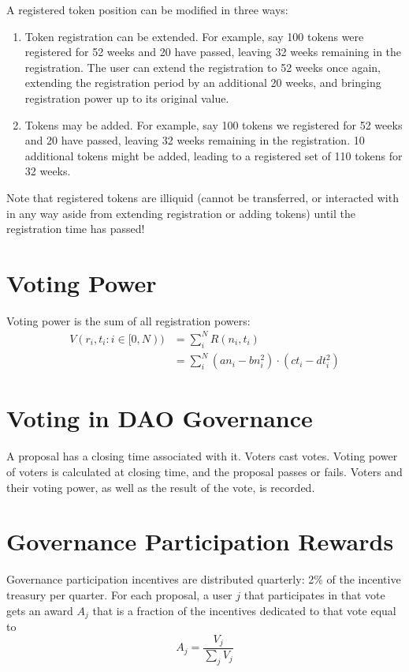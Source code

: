 \documentclass{article}
\begin{document}
A registered token position can be modified in three ways:
\begin{enumerate}
    \item Token registration can be extended.
       For example, say 100 tokens were registered for 52 weeks and 20 have passed, leaving 32 weeks remaining in the registration.
       The user can extend the registration to 52 weeks once again, extending the registration period by an additional 20 weeks, and bringing registration power up to its original value.
    \item Tokens may be added.
       For example, say 100 tokens we registered for 52 weeks and 20 have passed, leaving 32 weeks remaining in the registration.
       10 additional tokens might be added, leading to a registered set of 110 tokens for 32 weeks.
\end{enumerate}

Note that registered tokens are illiquid (cannot be transferred, or interacted with in any way aside from extending registration or adding tokens) until the registration time has passed!



\section{Voting Power}\label{sec:votingpower}

Voting power is the sum of all registration powers:
\begin{align}
V(r_i, t_i: i\in[0,N)) &= \sum_i^N R(n_i, t_i)\\
  &= \sum_i^N (an_i - bn_i^2) \cdot (ct_i - dt_i^2)
\end{align}


\section{Voting in DAO Governance}\label{sec:voting}

A proposal has a closing time associated with it.
Voters cast votes.
Voting power of voters is calculated at closing time, and the proposal passes or fails.
Voters and their voting power, as well as the result of the vote, is recorded.

\section{Governance Participation Rewards}\label{sec:rewards}

Governance participation incentives are distributed quarterly: 2\% of the incentive treasury per quarter.
For each proposal, a user $j$ that participates in that vote gets an award $A_j$ that is a fraction of the incentives dedicated to that vote equal to
\begin{equation}
A_j = \frac{V_j}{\sum_j V_j}
\end{equation}
\end{document}
